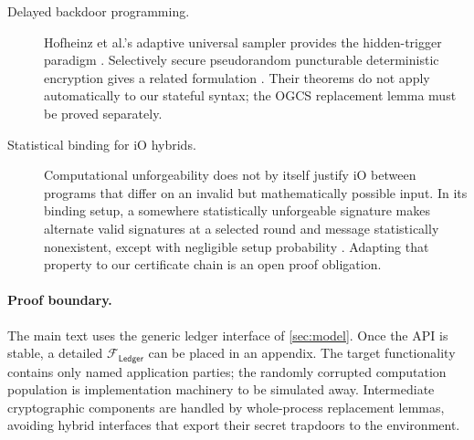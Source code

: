\begin{description}
  \item[Delayed backdoor programming.] Hofheinz et al.'s adaptive universal
    sampler provides the hidden-trigger paradigm
    \cite{HofheinzEtAl2014UniversalSamplers}.  Selectively secure pseudorandom
    puncturable deterministic encryption gives a related formulation
    \cite{KoppulaPoelstraWaters2017FastSamplers}.  Their theorems do not apply
    automatically to our stateful syntax; the OGCS replacement lemma must be
    proved separately.

  \item[Statistical binding for iO hybrids.] Computational unforgeability does
    not by itself justify iO between programs that differ on an invalid but
    mathematically possible input.  In its binding setup, a somewhere
    statistically unforgeable signature makes alternate valid signatures at a
    selected round and message statistically nonexistent, except with
    negligible setup probability \cite{FernandoEtAl2023SSU}.  Adapting that
    property to our certificate chain is an open proof obligation.
\end{description}

\paragraph{Proof boundary.}
The main text uses the generic ledger interface of \cref{sec:model}.  Once the
API is stable, a detailed $\mathcal F_{\mathsf{Ledger}}$ can be placed in an
appendix.  The target functionality contains only named application parties;
the randomly corrupted computation population is implementation machinery to
be simulated away.  Intermediate cryptographic components are handled by
whole-process replacement lemmas, avoiding hybrid interfaces that export
their secret trapdoors to the environment.
